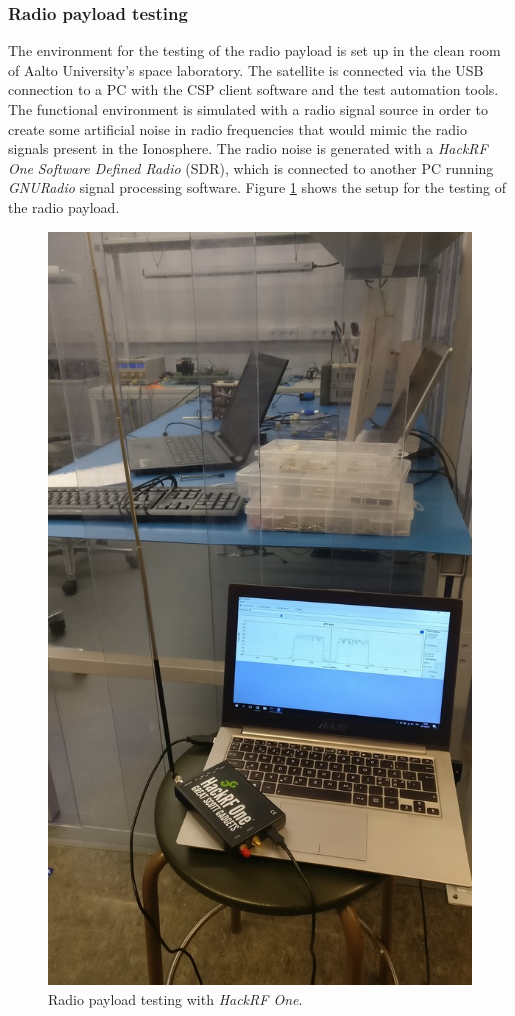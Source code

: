\documentclass[english,12pt,a4paper,pdftex,elec,utf8]{aaltothesis}
\begin{document}
\subsubsection{Radio payload testing}
The environment for the testing of the radio payload is set up in the clean room of Aalto University's space laboratory. The satellite is connected via the USB connection to a PC with the CSP client software and the test automation tools. The functional environment is simulated with a radio signal source in order to create some artificial noise in radio frequencies that would mimic the radio signals present in the Ionosphere. The radio noise is generated with a \textit{HackRF One} \textit{Software Defined Radio} (SDR), which is connected to another PC running \textit{GNURadio} signal processing software.
Figure \ref{s100hackrf} shows the setup for the testing of the radio payload.\par   
\begin{figure}[h!]
\centering
\includegraphics[scale=0.3]{payload_testing_hackrf}
\caption{Radio payload testing with \textit{HackRF One}.}
\label{s100hackrf}
\end{figure}
\end{document}
